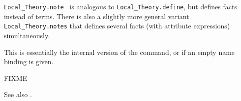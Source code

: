 \begin{isabellebody}
\begin{isamarkuptext}
\begin{description}
  \item \verb|Local_Theory.note|~ is
  analogous to \verb|Local_Theory.define|, but defines facts instead of
  terms.  There is also a slightly more general variant \verb|Local_Theory.notes| that defines several facts (with attribute
  expressions) simultaneously.

  This is essentially the internal version of the \hyperlink{command.lemmas}{\mbox{}}
  command, or \hyperlink{command.declare}{\mbox{}} if an empty name binding is given.

  \end{description}%
\end{isamarkuptext}%
\isamarkuptrue%
%
\endisatagmlref
{\isafoldmlref}%
%
\isadelimmlref
%
\endisadelimmlref
%
\isamarkuptrue%
%
\begin{isamarkuptext}%
FIXME

  \medskip See also \cite{Chaieb-Wenzel:2007}.%
\end{isamarkuptext}%
\isamarkuptrue%
%
\isadelimtheory
%
\endisadelimtheory
%
\isatagtheory
{}\isamarkupfalse%
%
\endisatagtheory
{\isafoldtheory}%
%
\isadelimtheory
%
\endisadelimtheory
\isanewline
\end{isabellebody}%
